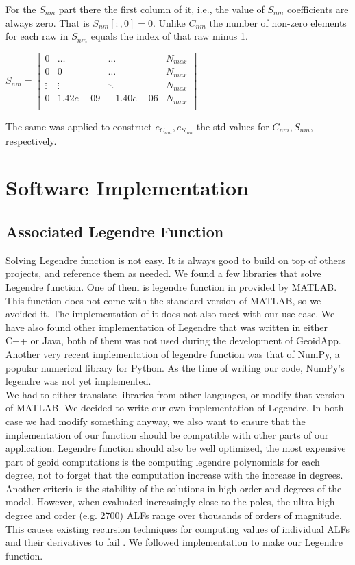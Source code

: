 	For the $S_{nm}$ part there the first column of it, i.e., the value of $S_{nm}$ coefficients are always zero. That is $S_{nm}[:, 0] = 0$. Unlike $C_{nm}$ the number of non-zero elements for each raw in $S_{nm}$ equals the index of that raw minus 1.
	
	\(
		S_{nm} = \begin{bmatrix}
		0 & \ldots &\ldots & N_{max}\\
		0 & 0 & \dots & N_{max}\\
		\vdots &\vdots &\ddots & N_{max}\\
		0 &  1.42e-09& -1.40e-06 & N_{max}\\
		
		\end{bmatrix}
	\)
	

	The same was applied to construct $e_{C_{nm}}, e_{S_{nm}}$ the std values for $C_{nm}, S_{nm}$, respectively.


\section{Software Implementation}
\subsection{Associated Legendre Function}

Solving Legendre function is not easy. It is always good to build on top of others projects, and reference them as needed. We found a few libraries that solve Legendre function. One of them is legendre function in provided by MATLAB. This function does not come with the standard version of MATLAB, so we avoided it. The implementation of it does not also meet with our use case. We have also found other implementation of Legendre that was written in either C++ or Java, both of them was not used during the development of GeoidApp. Another very recent implementation of legendre function was that of NumPy, a popular numerical library for Python. As the time of writing our code, NumPy's legendre was not yet implemented.
\\
We had to either translate libraries from other languages, or modify that version of MATLAB. We decided to write our own implementation of Legendre. In both case we had modify something anyway, we also want to ensure that the implementation of our function should be compatible with other parts of our application. Legendre function should also be well optimized, the most expensive part of geoid computations is the computing legendre polynomials for each degree, not to forget that the computation increase with the increase in degrees. Another criteria is the stability of the solutions in high order and degrees of the model. However, when evaluated increasingly close to
the poles, the ultra-high degree and order (e.g. 2700)
ALFs range over thousands of orders of magnitude. This
causes existing recursion techniques for computing values
of individual ALFs and their derivatives to fail \cite{holmes}. We followed \cite{holmes} implementation to make our Legendre function.

